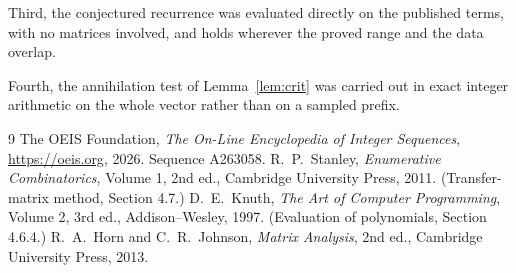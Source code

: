 \documentclass[11pt,a4paper]{article}
\theoremstyle{plain}
\theoremstyle{definition}
\begin{document}
Third, the conjectured recurrence was evaluated directly on the published terms, with no
matrices involved, and holds wherever the proved range and the data overlap.

Fourth, the annihilation test of Lemma~\ref{lem:crit} was carried out in exact integer
arithmetic on the whole vector rather than on a sampled prefix.

\begin{thebibliography}{9}
 The OEIS Foundation, \emph{The On-Line Encyclopedia of Integer
Sequences}, \url{https://oeis.org}, 2026. Sequence A263058.
 R.~P.~Stanley, \emph{Enumerative Combinatorics}, Volume 1, 2nd ed.,
Cambridge University Press, 2011. (Transfer-matrix method, Section 4.7.)
 D.~E.~Knuth, \emph{The Art of Computer Programming}, Volume 2, 3rd ed.,
Addison--Wesley, 1997. (Evaluation of polynomials, Section 4.6.4.)
 R.~A.~Horn and C.~R.~Johnson, \emph{Matrix Analysis}, 2nd ed., Cambridge
University Press, 2013.
\end{thebibliography}
\end{document}
